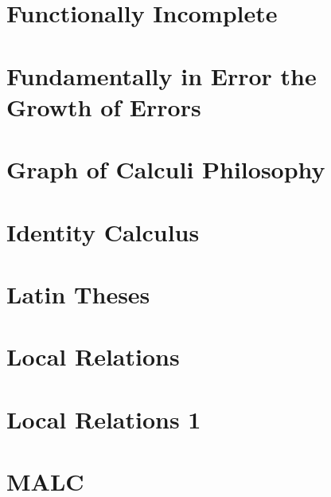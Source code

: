\documentclass{report}
\begin{document}
%

\chapter{Functionally Incomplete}


\chapter{Fundamentally in Error the Growth of Errors}


\chapter{Graph of Calculi Philosophy}


\chapter{Identity Calculus}


\chapter{Latin Theses}


\chapter{Local Relations}


\chapter{Local Relations 1}


\chapter{MALC}

\end{document}

